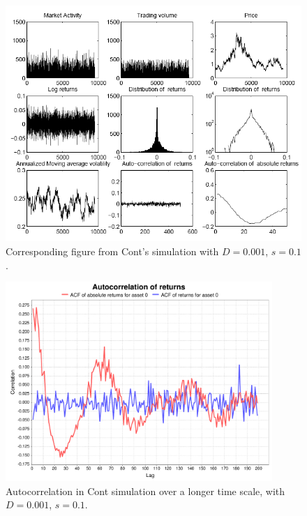 \documentclass[runningheads]{llncs}
\begin{document}
\begin{figure}[htbp]
  \begin{center}
    \includegraphics[width=1.0\textwidth]{../graphics/Cont-Fig4.png}
    \caption{Corresponding figure from Cont's simulation with $D=0.001$, $s=0.1$.}
    \label{fig:ContFig4}
  \end{center}
\end{figure}

\begin{figure}[htbp]
  \begin{center}
   \includegraphics[width=0.9\textwidth]{../graphics/Cont-acfPlot.pdf}
    \caption{Autocorrelation in Cont simulation over a longer time scale, with $D=0.001$, $s=0.1$.}
    \label{fig:ContACF1}
  \end{center}
\end{figure}
\end{document}
